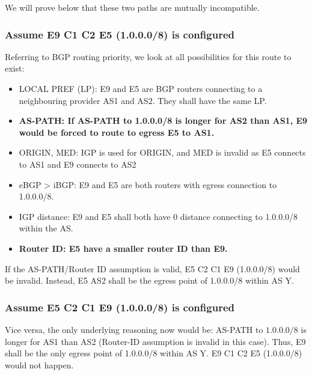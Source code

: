 \documentclass[12pt]{article}
\begin{document}
We will prove below that these two paths are mutually incompatible.

\subsubsection{Assume E9 \textrightarrow{} C1 \textrightarrow{} C2 \textrightarrow{} E5 (1.0.0.0/8) is configured}

Referring to BGP routing priority, we look at all possibilities for this route to exist:
\begin{itemize}
    \item LOCAL PREF (LP): E9 and E5 are BGP routers connecting to a neighbouring provider AS1 and AS2. They shall have the same LP.
    \item \textbf{AS-PATH: If AS-PATH to 1.0.0.0/8 is longer for AS2 than AS1, E9 would be forced to route to egress E5 to AS1.}
    \item \textcolor{mygray}{ORIGIN, MED: IGP is used for ORIGIN, and MED is invalid as E5 connects to AS1 and E9 connects to AS2}
    \item eBGP \textgreater{} iBGP: E9 and E5 are both routers with egress connection to 1.0.0.0/8.
    \item IGP distance: E9 and E5 shall both have 0 distance connecting to 1.0.0.0/8 within the AS.
    \item \textbf{Router ID: E5 have a smaller router ID than E9.}
\end{itemize}

If the AS-PATH/Router ID assumption is valid, E5 \textrightarrow{} C2 \textrightarrow{} C1 \textrightarrow{} E9 (1.0.0.0/8) would be invalid. Instead, E5 \textrightarrow{} AS2 shall be the egress point of 1.0.0.0/8 within AS Y.

\subsubsection{Assume E5 \textrightarrow{} C2 \textrightarrow{} C1 \textrightarrow{} E9 (1.0.0.0/8) is configured}

Vice versa, the only underlying reasoning now would be: AS-PATH to $1.0.0.0/8$ is longer for AS1 than AS2 (Router-ID assumption is invalid in this case). Thus, E9 shall be the only egress point of 1.0.0.0/8 within AS Y. E9 \textrightarrow{} C1 \textrightarrow{} C2 \textrightarrow{} E5 (1.0.0.0/8) would not happen.

\subsection{}
\end{document}
